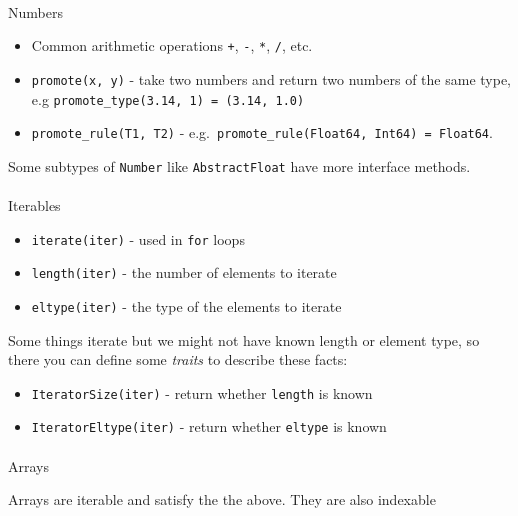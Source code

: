 \documentclass[
]{article}
\makeatletter
\let\oldparagraph\paragraph
\renewcommand{\paragraph}{
    \@ifstar
      \xxxParagraphStar
      \xxxParagraphNoStar
  }
\newcommand{\xxxParagraphStar}[1]{\oldparagraph*{#1}\mbox{}}
\newcommand{\xxxParagraphNoStar}[1]{\oldparagraph{#1}\mbox{}}
\providecommand{\tightlist}{%
  \setlength{\itemsep}{0pt}\setlength{\parskip}{0pt}}
\makeatother
\begin{document}
\paragraph{Numbers}\label{numbers}

\begin{itemize}
\tightlist
\item
  Common arithmetic operations \texttt{+}, \texttt{-}, \texttt{*},
  \texttt{/}, etc.
\item
  \texttt{promote(x,\ y)} - take two numbers and return two numbers of
  the same type, e.g \texttt{promote\_type(3.14,\ 1)\ =\ (3.14,\ 1.0)}
\item
  \texttt{promote\_rule(T1,\ T2)} -
  e.g.~\texttt{promote\_rule(Float64,\ Int64)\ =\ Float64}.
\end{itemize}

Some subtypes of \texttt{Number} like \texttt{AbstractFloat} have more
interface methods.

\paragraph{Iterables}\label{iterables}

\begin{itemize}
\tightlist
\item
  \texttt{iterate(iter)} - used in \texttt{for} loops
\item
  \texttt{length(iter)} - the number of elements to iterate
\item
  \texttt{eltype(iter)} - the type of the elements to iterate
\end{itemize}

Some things iterate but we might not have known length or element type,
so there you can define some \emph{traits} to describe these facts:

\begin{itemize}
\tightlist
\item
  \texttt{IteratorSize(iter)} - return whether \texttt{length} is known
\item
  \texttt{IteratorEltype(iter)} - return whether \texttt{eltype} is
  known
\end{itemize}

\paragraph{Arrays}\label{arrays-1}

Arrays are iterable and satisfy the the above. They are also indexable
\end{document}
